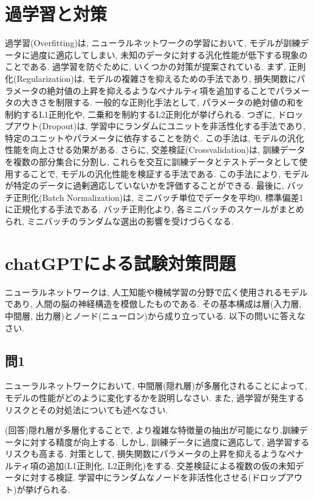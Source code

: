 \documentclass[dvipdfmx, 10pt]{jsarticle}
\begin{document}
\section*{過学習と対策}
過学習(Overfitting)は, ニューラルネットワークの学習において, モデルが訓練データに過度に適応してしまい, 未知のデータに対する汎化性能が低下する現象のことである. 
過学習を防ぐために, いくつかの対策が提案されている. 
まず, 正則化(Regularization)は, モデルの複雑さを抑えるための手法であり, 
損失関数にパラメータの絶対値の上昇を抑えるようなペナルティ項を追加することでパラメータの大きさを制限する. 
一般的な正則化手法として, パラメータの絶対値の和を制約するL1正則化や, 二乗和を制約するL2正則化が挙げられる. 
つぎに, ドロップアウト(Dropout)は, 学習中にランダムにユニットを非活性化する手法であり, 特定のユニットやパラメータに依存することを防ぐ. 
この手法は, モデルの汎化性能を向上させる効果がある. 
さらに, 交差検証(Crossvalidation)は, 訓練データを複数の部分集合に分割し, これらを交互に訓練データとテストデータとして使用することで, 
モデルの汎化性能を検証する手法である. この手法により, モデルが特定のデータに過剰適応していないかを評価することができる. 
最後に, バッチ正則化(Batch Normalization)は, ミニバッチ単位でデータを平均0, 標準偏差1に正規化する手法である. 
バッチ正則化より, 各ミニバッチのスケールがまとめられ, ミニバッチのランダムな選出の影響を受けづらくなる. 

\section*{chatGPTによる試験対策問題}

ニューラルネットワークは, 人工知能や機械学習の分野で広く使用されるモデルであり, 人間の脳の神経構造を模倣したものである. その基本構成は層(入力層, 中間層, 出力層)とノード(ニューロン)から成り立っている. 以下の問いに答えなさい. 

\subsection*{問1}
ニューラルネットワークにおいて, 中間層(隠れ層)が多層化されることによって, モデルの性能がどのように変化するかを説明しなさい. また, 過学習が発生するリスクとその対処法についても述べなさい. 

(回答)隠れ層が多層化することで, より複雑な特徴量の抽出が可能になり,訓練データに対する精度が向上する. 
しかし, 訓練データに過度に適応して, 過学習するリスクも高まる. 
対策として, 損失関数にパラメータの上昇を抑えるようなペナルティ項の追加(L1正則化, L2正則化)をする. 
交差検証による複数の仮の未知データに対する検証. 学習中にランダムなノードを非活性化させる(ドロップアウト)が挙げられる. 
\end{document}
